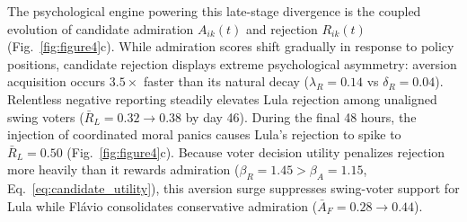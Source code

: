 \documentclass{article}
\begin{document}
The psychological engine powering this late-stage divergence is the coupled evolution of candidate admiration $A_{ik}(t)$ and rejection $R_{ik}(t)$ (Fig.~\ref{fig:figure4}c). While admiration scores shift gradually in response to policy positions, candidate rejection displays extreme psychological asymmetry: aversion acquisition occurs $3.5\times$ faster than its natural decay ($\lambda_R = 0.14$ vs $\delta_R = 0.04$). Relentless negative reporting steadily elevates Lula rejection among unaligned swing voters ($\bar{R}_L = 0.32 \to 0.38$ by day 46). During the final 48 hours, the injection of coordinated moral panics causes Lula's rejection to spike to $\bar{R}_L = 0.50$ (Fig.~\ref{fig:figure4}c). Because voter decision utility penalizes rejection more heavily than it rewards admiration ($\beta_R = 1.45 > \beta_A = 1.15$, Eq.~\eqref{eq:candidate_utility}), this aversion surge suppresses swing-voter support for Lula while Fl{\'a}vio consolidates conservative admiration ($\bar{A}_F = 0.28 \to 0.44$).
\end{document}
